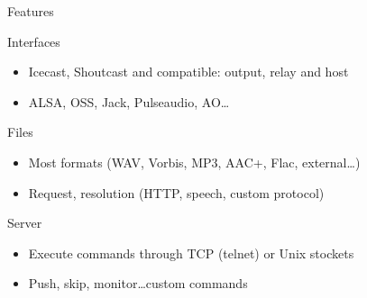 \documentclass{beamer}
\begin{document}
\begin{frame}{Features}

\begin{block}{Interfaces}
\begin{itemize}
\item Icecast, Shoutcast and compatible: output, relay and host
\item ALSA, OSS, Jack, Pulseaudio, AO\ldots
\end{itemize}
\end{block}

\begin{block}{Files}
\begin{itemize}
\item Most formats (WAV, Vorbis, MP3, AAC+, Flac, external\ldots)
\item Request, resolution (HTTP, speech, custom protocol)
\end{itemize}
\end{block}

\begin{block}{Server}
\begin{itemize}
\item Execute commands through TCP (telnet) or Unix stockets
\item Push, skip, monitor\ldots custom commands
\end{itemize}
\end{block}

\end{frame}

\end{document}
